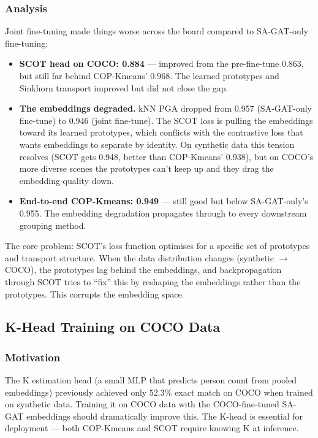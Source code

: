 \subsubsection{Analysis}

Joint fine-tuning made things worse across the board compared to SA-GAT-only fine-tuning:

\begin{itemize}
    \item \textbf{SCOT head on COCO: 0.884} --- improved from the pre-fine-tune 0.863, but still far behind COP-Kmeans' 0.968. The learned prototypes and Sinkhorn transport improved but did not close the gap.
    \item \textbf{The embeddings degraded.} kNN PGA dropped from 0.957 (SA-GAT-only fine-tune) to 0.946 (joint fine-tune). The SCOT loss is pulling the embeddings toward its learned prototypes, which conflicts with the contrastive loss that wants embeddings to separate by identity. On synthetic data this tension resolves (SCOT gets 0.948, better than COP-Kmeans' 0.938), but on COCO's more diverse scenes the prototypes can't keep up and they drag the embedding quality down.
    \item \textbf{End-to-end COP-Kmeans: 0.949} --- still good but below SA-GAT-only's 0.955. The embedding degradation propagates through to every downstream grouping method.
\end{itemize}

The core problem: SCOT's loss function optimises for a specific set of prototypes and transport structure. When the data distribution changes (synthetic $\to$ COCO), the prototypes lag behind the embeddings, and backpropagation through SCOT tries to ``fix'' this by reshaping the embeddings rather than the prototypes. This corrupts the embedding space.


\subsection{K-Head Training on COCO Data}

\subsubsection{Motivation}

The K estimation head (a small MLP that predicts person count from pooled embeddings) previously achieved only 52.3\% exact match on COCO when trained on synthetic data. Training it on COCO data with the COCO-fine-tuned SA-GAT embeddings should dramatically improve this. The K-head is essential for deployment --- both COP-Kmeans and SCOT require knowing K at inference.


